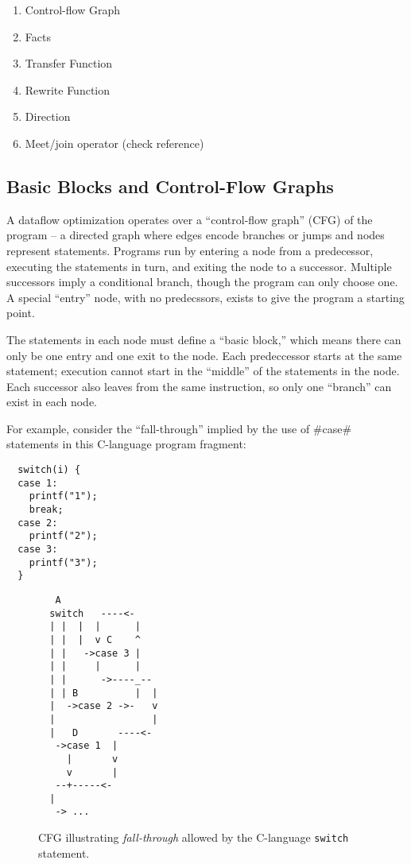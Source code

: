 \documentclass[12pt]{report}
\begin{document}
\begin{enumerate}
\item Control-flow Graph
\item Facts
\item Transfer Function
\item Rewrite Function
\item Direction
\item Meet/join operator (check reference)
\end{enumerate}

\subsection{Basic Blocks and Control-Flow Graphs}

A dataflow optimization operates over a ``control-flow graph'' (CFG)
of the program -- a directed graph where edges encode branches or
jumps and nodes represent statements. Programs run by entering a node
from a predecessor, executing the statements in turn, and exiting the
node to a successor. Multiple successors imply a conditional branch,
though the program can only choose one. A special ``entry'' node, with
no predecssors, exists to give the program a starting point.

The statements in each node must define a ``basic block,'' which means
there can only be one entry and one exit to the node. Each
predeccessor starts at the same statement; execution cannot start in
the ``middle'' of the statements in the node. Each successor also
leaves from the same instruction, so only one ``branch'' can exist in
each node.

For example, consider the ``fall-through'' implied by the use of #case#
statements in this C-language program fragment:

\begin{verbatim}
  switch(i) {
  case 1:
    printf("1");
    break;
  case 2:
    printf("2");
  case 3:
    printf("3");
  }
\end{verbatim}

\begin{figure}[h]
\begin{verbatim}
   A
  switch   ----<-
  | |  |  |      |
  | |  |  v C    ^
  | |   ->case 3 |
  | |     |      |
  | |      ->----_--
  | | B          |  |
  |  ->case 2 ->-   v
  |                 |
  |   D       ----<-
   ->case 1  |
     |       v
     v       |
   --+-----<-
  |
   -> ...
\end{verbatim}
\caption{CFG illustrating \emph{fall-through} allowed by the
  C-language \texttt{switch} statement.}
\label{switchCfgEg}
\end{figure}
\end{document}

